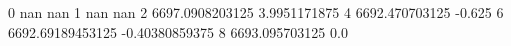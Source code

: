 0 nan nan
1 nan nan
2 6697.0908203125 3.9951171875
4 6692.470703125 -0.625
6 6692.69189453125 -0.40380859375
8 6693.095703125 0.0
